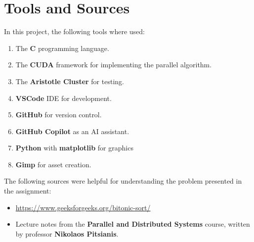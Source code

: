 \documentclass[12pt]{report}
\begin{document}
\chapter{Tools and Sources}

In this project, the following tools where used:
\begin{enumerate}
    \item The \textbf{C} programming language.
    \item The \textbf{CUDA} framework for implementing the parallel algorithm.
    \item The \textbf{Aristotle Cluster} for testing.
    \item \textbf{VSCode} IDE for development.
    \item \textbf{GitHub} for version control.
    \item \textbf{GitHub Copilot} as an AI assistant.
    \item \textbf{Python} with \textbf{matplotlib} for graphics
    \item \textbf{Gimp} for asset creation.
\end{enumerate}

The following sources were helpful for understanding the problem presented in the assignment:
\begin{itemize}
    \item \url{https://www.geeksforgeeks.org/bitonic-sort/}
    \item Lecture notes from the \textbf{Parallel and Distributed Systems} course, written by professor \textbf{Nikolaos Pitsianis}.
\end{itemize}
\end{document}
